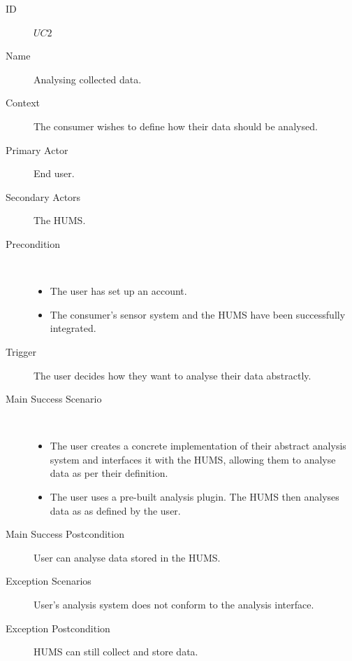 \documentclass[10pt,a4paper]{article}
\begin{document}
\begin{description}
	\item[ID] $UC2$
	\item[Name] Analysing collected data.
	\item[Context] The consumer wishes to define how their data should be
	               analysed.
	\item[Primary Actor] End user.
	\item[Secondary Actors] The HUMS.
	\item[Precondition] ~
			\begin{itemize}
				\item The user has set up an account.
				\item The consumer's sensor system and the HUMS have been
				      successfully integrated.
			\end{itemize}
	\item[Trigger] The user decides how they want to analyse their data
	               abstractly.
	\item[Main Success Scenario] ~
			\begin{itemize}
				\item The user creates a concrete implementation of their abstract
				      analysis system and interfaces it with the HUMS, allowing them to
				      analyse data as per their definition.
				\item The user uses a pre-built analysis plugin. The HUMS
				      then analyses data as as defined by the user.
			\end{itemize}
	\item[Main Success Postcondition] User can analyse data stored in the HUMS.
	\item[Exception Scenarios] User's analysis system does not conform to the
			analysis interface.
	\item[Exception Postcondition] HUMS can still collect and store data.
\end{description}

\vspace{\baselineskip}
\end{document}
